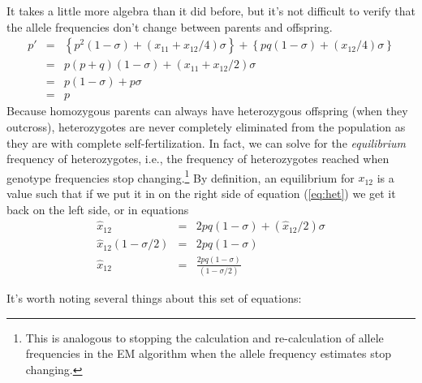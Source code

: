 It takes a little more algebra than it did before, but it's not
difficult to verify that the allele frequencies don't change between
parents and offspring.
\begin{eqnarray}
p' &=& \left\{p^2(1-\sigma) + (x_{11} + x_{12}/4)\sigma\right\}
       + \left\{pq(1-\sigma) + (x_{12}/4)\sigma\right\} \\
   &=& p(p+q)(1-\sigma) + (x_{11} + x_{12}/2)\sigma \\
   &=& p(1-\sigma) + p\sigma \\
   &=& p
\end{eqnarray}
Because homozygous parents can always have heterozygous offspring
(when they outcross), heterozygotes are never completely eliminated
from the population as they are with complete self-fertilization. In
fact, we can solve for the {\it equilibrium} frequency of
heterozygotes, i.e., the frequency of heterozygotes reached when
genotype frequencies stop changing.\footnote{This is analogous to
  stopping the calculation and re-calculation of allele frequencies in
  the EM algorithm when the allele frequency estimates stop changing.}
By definition, an equilibrium for $x_{12}$ is a value such that if we
put it in on the right side of equation (\ref{eq:het}) we get it back
on the left side, or in equations
\begin{eqnarray}
\hat x_{12} &=& 2pq(1-\sigma) + (\hat x_{12}/2)\sigma \\
\hat x_{12}(1 - \sigma/2) &=& 2pq(1-\sigma) \\
\hat x_{12} &=& \frac{2pq(1-\sigma)}{(1-\sigma/2)}
\end{eqnarray}

\noindent It's worth noting several things about this set of
equations:

